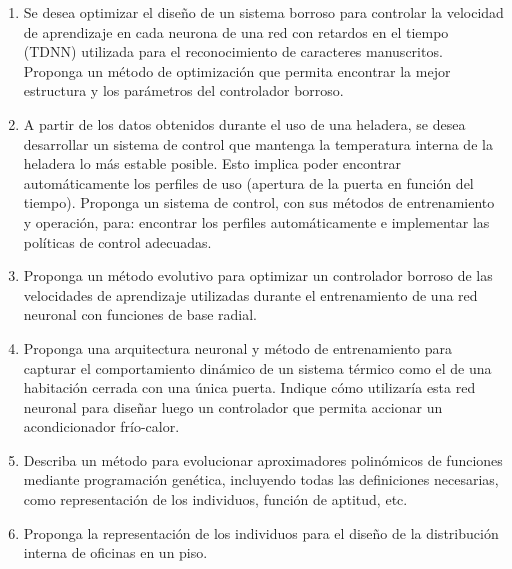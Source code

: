 \documentclass[a4paper,10pt,spanish]{article}
\begin{document}
\begin{enumerate}
\item Se desea optimizar el diseño de un sistema borroso para controlar la velocidad de aprendizaje en cada neurona de una red con retardos en el tiempo (TDNN) utilizada para el reconocimiento de caracteres manuscritos. Proponga un método de optimización que permita encontrar la mejor estructura y los parámetros del controlador borroso.

\item A partir de los datos obtenidos durante el uso de una heladera, se desea desarrollar un sistema de control que mantenga la temperatura interna de la heladera lo más estable posible. Esto implica poder encontrar automáticamente los perfiles de uso (apertura de la puerta en función del tiempo). Proponga un sistema de control, con sus métodos de entrenamiento y operación, para: encontrar los perfiles automáticamente e implementar las políticas de control adecuadas.

\item Proponga un método evolutivo para optimizar un controlador borroso de las velocidades de aprendizaje utilizadas durante el entrenamiento de una red neuronal con funciones de base radial.

\item Proponga una arquitectura neuronal y método de entrenamiento para capturar el comportamiento dinámico de un sistema térmico como el de una habitación cerrada con una única puerta. Indique cómo utilizaría esta red neuronal para diseñar luego un controlador que permita accionar un acondicionador frío-calor.

\item Describa un método para evolucionar aproximadores polinómicos de funciones mediante programación genética, incluyendo todas las definiciones necesarias, como representación de los individuos, función de aptitud, etc.

\item Proponga la representación de los individuos para el diseño de la distribución interna de oficinas en un piso.
\end{enumerate}
\end{document}
